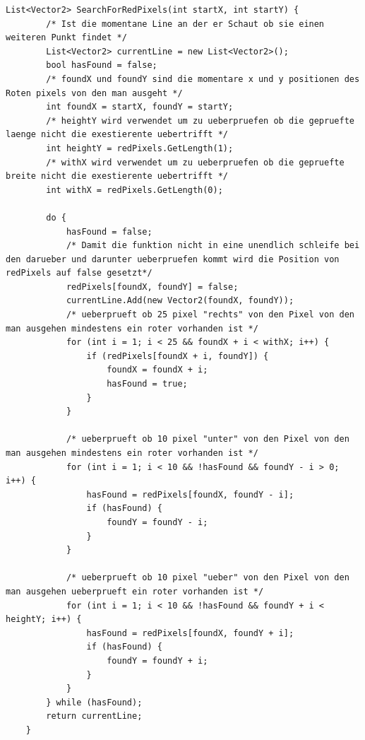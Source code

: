 \begin{lstlisting}[style=csharp, caption={Kabel suche}, label=code:SearchForRedPixels]
List<Vector2> SearchForRedPixels(int startX, int startY) {
        /* Ist die momentane Line an der er Schaut ob sie einen weiteren Punkt findet */
        List<Vector2> currentLine = new List<Vector2>();
        bool hasFound = false;
        /* foundX und foundY sind die momentare x und y positionen des Roten pixels von den man ausgeht */
        int foundX = startX, foundY = startY;
        /* heightY wird verwendet um zu ueberpruefen ob die gepruefte laenge nicht die exestierente uebertrifft */
        int heightY = redPixels.GetLength(1);
        /* withX wird verwendet um zu ueberpruefen ob die gepruefte breite nicht die exestierente uebertrifft */
        int withX = redPixels.GetLength(0);

        do {
            hasFound = false;
            /* Damit die funktion nicht in eine unendlich schleife bei den darueber und darunter ueberpruefen kommt wird die Position von redPixels auf false gesetzt*/
            redPixels[foundX, foundY] = false;
            currentLine.Add(new Vector2(foundX, foundY));
            /* ueberprueft ob 25 pixel "rechts" von den Pixel von den man ausgehen mindestens ein roter vorhanden ist */
            for (int i = 1; i < 25 && foundX + i < withX; i++) {
                if (redPixels[foundX + i, foundY]) {
                    foundX = foundX + i;
                    hasFound = true;
                }
            }

            /* ueberprueft ob 10 pixel "unter" von den Pixel von den man ausgehen mindestens ein roter vorhanden ist */
            for (int i = 1; i < 10 && !hasFound && foundY - i > 0; i++) {
                hasFound = redPixels[foundX, foundY - i];
                if (hasFound) {
                    foundY = foundY - i;
                }
            }

            /* ueberprueft ob 10 pixel "ueber" von den Pixel von den man ausgehen ueberprueft ein roter vorhanden ist */
            for (int i = 1; i < 10 && !hasFound && foundY + i < heightY; i++) {
                hasFound = redPixels[foundX, foundY + i];
                if (hasFound) {
                    foundY = foundY + i;
                }
            }
        } while (hasFound);
        return currentLine;
    }
\end{lstlisting}
